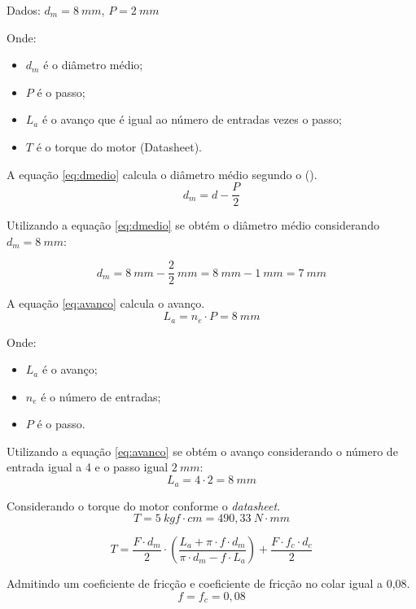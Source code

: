 Dados:
$d_{m} = 8~mm$, $P = 2~mm$

Onde:
\begin{itemize}
    \item $d_{m}$ é o diâmetro médio;
    \item $P$ é o passo;
    \item $L_{a}$ é o avanço que é igual ao número de entradas vezes o passo;
    \item $T$ é o torque do motor (Datasheet).
\end{itemize}

A equação \ref{eq:dmedio} calcula o diâmetro médio segundo o \citeauthor{budynas2016elementos} (\citeyear{budynas2016elementos}).
\begin{equation}\label{eq:dmedio}
    d_{m} = d - \frac{P}{2}
\end{equation}

Utilizando a equação \ref{eq:dmedio} se obtém o diâmetro médio considerando $d_{m} = 8~mm$:

$$d_{m} = 8~mm - \frac{2}{2}~mm = 8~mm - 1~mm = 7~mm$$

A equação \ref{eq:avanco} calcula o avanço.
\begin{equation}\label{eq:avanco}
    L_{a} = n_{e} \cdot P = 8~mm
\end{equation}

Onde:
\begin{itemize}
    \item $L_{a}$ é o avanço;
    \item $n_{e}$ é o número de entradas;
    \item $P$ é o passo.
\end{itemize}

Utilizando a equação \ref{eq:avanco} se obtém o avanço considerando o número de entrada igual a 4 e o passo igual $2~mm$:
$$L_{a} = 4 \cdot 2 = 8~mm$$ 

Considerando o torque do motor conforme o \textit{datasheet}.
$$T = 5~kgf \cdot cm = 490,33~N \cdot mm$$

\begin{equation}\label{eq:torque}
T = \frac{F \cdot d_{m}}{2} \cdot (\frac{L_{a} + \pi \cdot f \cdot d_{m}}{\pi \cdot d_{m} - f \cdot L_{a}}) + \frac{F \cdot f_{c} \cdot d_{c}}{2}
\end{equation}

Admitindo um coeficiente de fricção e coeficiente de fricção no colar igual a 0,08.
$$f = f_{c} = 0,08$$

